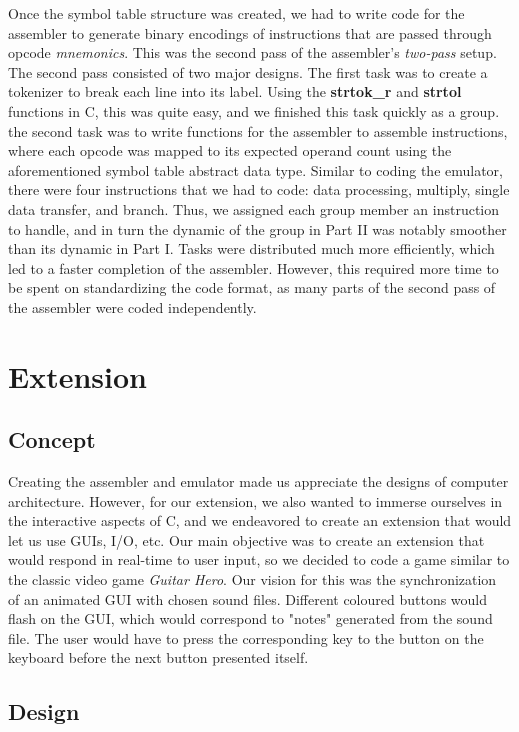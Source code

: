 \documentclass[11pt]{article}
\begin{document}
Once the symbol table structure was created, we had to write code for the assembler to generate binary encodings of instructions that are passed through opcode \emph{mnemonics}. This was the second pass of the assembler's \emph{two-pass} setup. The second pass consisted of two major designs. The first task was to create a tokenizer to break each line into its label. Using the \textbf{strtok\_r} and \textbf{strtol} functions in C, this was quite easy, and we finished this task quickly as a group. the second task was to write functions for the assembler to assemble instructions, where each opcode was mapped to its expected operand count using the aforementioned symbol table abstract data type. Similar to coding the emulator, there were four instructions that we had to code: data processing, multiply, single data transfer, and branch. Thus, we assigned each group member an instruction to handle, and in turn the dynamic of the group in Part II was notably smoother than its dynamic in Part I. Tasks were distributed much more efficiently, which led to a faster completion of the assembler. However, this required more time to be spent on standardizing the code format, as many parts of the second pass of the assembler were coded independently.

\section{Extension}

\subsection{Concept}

Creating the assembler and emulator made us appreciate the designs of computer architecture. However, for our extension, we also wanted to immerse ourselves in the interactive aspects of C, and we endeavored to create an extension that would let us use GUIs, I/O, etc. Our main objective was to create an extension that would respond in real-time to user input, so we decided to code a game similar to the classic video game \emph{Guitar Hero}. Our vision for this was the synchronization of an animated GUI with chosen sound files. Different coloured buttons would flash on the GUI, which would correspond to "notes" generated from the sound file. The user would have to press the corresponding key to the button on the keyboard before the next button presented itself.

\subsection{Design}
\end{document}
